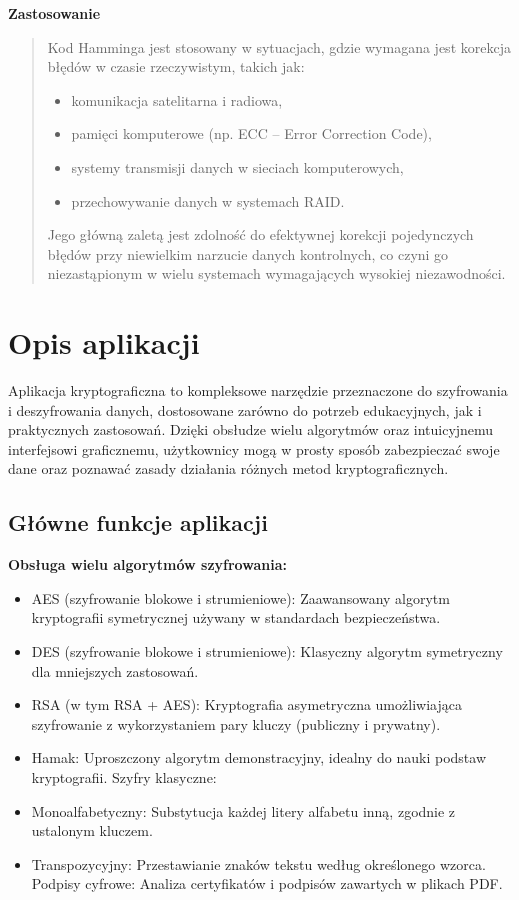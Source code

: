 \documentclass[12pt,a4paper]{article}
\begin{document}
\noindent\textbf{Zastosowanie}
\begin{quotation}\noindent Kod Hamminga jest stosowany w sytuacjach, gdzie wymagana jest korekcja błędów w czasie rzeczywistym, takich jak:
\begin{itemize}
\item komunikacja satelitarna i radiowa,\newline
\item pamięci komputerowe (np. ECC – Error Correction Code),\newline
\item systemy transmisji danych w sieciach komputerowych,\newline
\item przechowywanie danych w systemach RAID.
\end{itemize}
Jego główną zaletą jest zdolność do efektywnej korekcji pojedynczych błędów przy niewielkim narzucie danych kontrolnych, co czyni go niezastąpionym w wielu systemach wymagających wysokiej niezawodności.
\end{quotation}


\newpage
\section{Opis aplikacji}
\noindent Aplikacja kryptograficzna to kompleksowe narzędzie przeznaczone do szyfrowania i deszyfrowania danych, dostosowane zarówno do potrzeb edukacyjnych, jak i praktycznych zastosowań. Dzięki obsłudze wielu algorytmów oraz intuicyjnemu interfejsowi graficznemu, użytkownicy mogą w prosty sposób zabezpieczać swoje dane oraz poznawać zasady działania różnych metod kryptograficznych.\newline

\subsection{Główne funkcje aplikacji}
\textbf{Obsługa wielu algorytmów szyfrowania:}
\begin{itemize}
\item AES (szyfrowanie blokowe i strumieniowe): Zaawansowany algorytm kryptografii symetrycznej używany w standardach bezpieczeństwa.
\item DES (szyfrowanie blokowe i strumieniowe): Klasyczny algorytm symetryczny dla mniejszych zastosowań.
\item RSA (w tym RSA + AES): Kryptografia asymetryczna umożliwiająca szyfrowanie z wykorzystaniem pary kluczy (publiczny i prywatny).
\item Hamak: Uproszczony algorytm demonstracyjny, idealny do nauki podstaw kryptografii.
Szyfry klasyczne:
\item Monoalfabetyczny: Substytucja każdej litery alfabetu inną, zgodnie z ustalonym kluczem.
\item Transpozycyjny: Przestawianie znaków tekstu według określonego wzorca.
Podpisy cyfrowe: Analiza certyfikatów i podpisów zawartych w plikach PDF.
\end{itemize}
\end{document}
